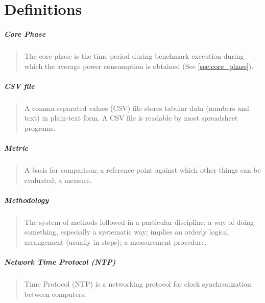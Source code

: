 \chapter{Definitions}
\label{sec:definitions}

\setlength{\parskip}{1pt}
\paragraph*{Core Phase}
\begin{quote}
The core phase is the time period during benchmark execution during which the average power consumption is obtained (See \ref{sec:core_phase}).
\end{quote}

\paragraph*{CSV file}
\begin{quote}
A comma-separated values (CSV) file stores tabular data (numbers and text) in plain-text form. A CSV file is readable by most spreadsheet programs.
\end{quote}

\paragraph*{Metric}
\begin{quote}
A basis for comparison; a reference point against which other things can be evaluated; a measure.
\end{quote}

\paragraph*{Methodology}
\begin{quote}
The system of methods followed in a particular discipline; a way of doing something, especially a systematic way; implies an orderly logical arrangement (usually in steps); a measurement procedure.
\end{quote}


\paragraph*{Network Time Protocol (NTP)}
\begin{quote}
Time Protocol (NTP) is a networking protocol for clock synchronization between computers.
\end{quote}

